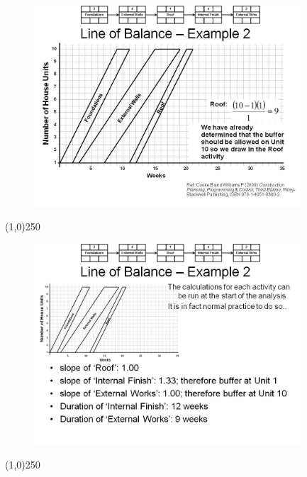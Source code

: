 \begin{frame}
\begin{figure}
	\centering
		\includegraphics[width = 10.0cm]{oldnotes/Slide263.jpg}
\end{figure}
\end{frame}
\begin{center}\line(1,0){250}\end{center}






\begin{frame}
\begin{figure}
	\centering
		\includegraphics[width = 10.0cm]{oldnotes/Slide264.jpg}
\end{figure}
\end{frame}
\begin{center}\line(1,0){250}\end{center}






